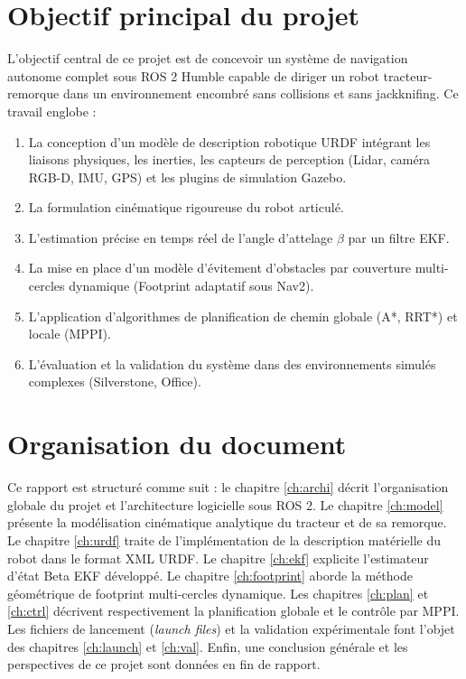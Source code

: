 \documentclass[12pt,a4paper,openany]{report}
\begin{document}
\section{Objectif principal du projet}
L'objectif central de ce projet est de concevoir un système de navigation autonome complet sous ROS 2 Humble capable de diriger un robot tracteur-remorque dans un environnement encombré sans collisions et sans jackknifing. Ce travail englobe :
\begin{enumerate}
    \item La conception d'un modèle de description robotique URDF intégrant les liaisons physiques, les inerties, les capteurs de perception (Lidar, caméra RGB-D, IMU, GPS) et les plugins de simulation Gazebo.
    \item La formulation cinématique rigoureuse du robot articulé.
    \item L'estimation précise en temps réel de l'angle d'attelage $\beta$ par un filtre EKF.
    \item La mise en place d'un modèle d'évitement d'obstacles par couverture multi-cercles dynamique (Footprint adaptatif sous Nav2).
    \item L'application d'algorithmes de planification de chemin globale (A*, RRT*) et locale (MPPI).
    \item L'évaluation et la validation du système dans des environnements simulés complexes (Silverstone, Office).
\end{enumerate}

\section{Organisation du document}
Ce rapport est structuré comme suit : le chapitre \ref{ch:archi} décrit l'organisation globale du projet et l'architecture logicielle sous ROS 2. Le chapitre \ref{ch:model} présente la modélisation cinématique analytique du tracteur et de sa remorque. Le chapitre \ref{ch:urdf} traite de l'implémentation de la description matérielle du robot dans le format XML URDF. Le chapitre \ref{ch:ekf} explicite l'estimateur d'état Beta EKF développé. Le chapitre \ref{ch:footprint} aborde la méthode géométrique de footprint multi-cercles dynamique. Les chapitres \ref{ch:plan} et \ref{ch:ctrl} décrivent respectivement la planification globale et le contrôle par MPPI. Les fichiers de lancement (\textit{launch files}) et la validation expérimentale font l'objet des chapitres \ref{ch:launch} et \ref{ch:val}. Enfin, une conclusion générale et les perspectives de ce projet sont données en fin de rapport.
\end{document}
